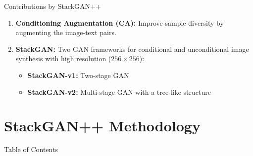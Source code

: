\documentclass{beamer}
\begin{document}



\begin{frame}{Contributions by StackGAN++}
    \begin{enumerate}
        \item \textbf{Conditioning Augmentation (CA):} Improve sample diversity by augmenting the image-text pairs.
        \vspace{1em}
        \item \textbf{StackGAN:} Two GAN frameworks for conditional and unconditional image synthesis with high resolution ($256 \times 256$):
        \vspace{0.5em}
        \begin{itemize}
            \item \textbf{StackGAN-v1:} Two-stage GAN
            \vspace{0.25em}
            \item \textbf{StackGAN-v2:} Multi-stage GAN with a tree-like structure
        \end{itemize}
    \end{enumerate}
\end{frame}

\section{StackGAN++ Methodology}
\begin{frame}{Table of Contents}
    \tableofcontents[currentsection]
\end{frame}
\end{document}
